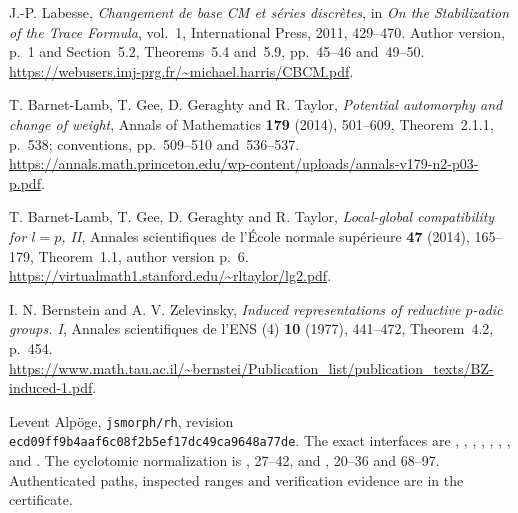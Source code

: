 J.-P. Labesse, \emph{Changement de base CM et s\'eries discr\`etes},
in \emph{On the Stabilization of the Trace Formula}, vol.~1,
International Press, 2011, 429--470.
Author version, p.~1 and Section~5.2, Theorems~5.4 and~5.9, pp.~45--46 and~49--50.
\url{https://webusers.imj-prg.fr/~michael.harris/CBCM.pdf}.

T. Barnet-Lamb, T. Gee, D. Geraghty and R. Taylor,
\emph{Potential automorphy and change of weight},
Annals of Mathematics \textbf{179} (2014), 501--609,
Theorem~2.1.1, p.~538; conventions, pp.~509--510 and~536--537.
\url{https://annals.math.princeton.edu/wp-content/uploads/annals-v179-n2-p03-p.pdf}.

T. Barnet-Lamb, T. Gee, D. Geraghty and R. Taylor,
\emph{Local-global compatibility for $l=p$, II},
Annales scientifiques de l'\'Ecole normale sup\'erieure
\textbf{47} (2014), 165--179,
Theorem~1.1, author version p.~6.
\url{https://virtualmath1.stanford.edu/~rltaylor/lg2.pdf}.

I. N. Bernstein and A. V. Zelevinsky,
\emph{Induced representations of reductive $p$-adic groups. I},
Annales scientifiques de l'ENS (4) \textbf{10} (1977), 441--472,
Theorem~4.2, p.~454.
\url{https://www.math.tau.ac.il/~bernstei/Publication_list/publication_texts/BZ-induced-1.pdf}.

Levent Alp\"oge, \texttt{jsmorph/rh},
revision \texttt{ecd09ff9b4aaf6c08f2b5ef17dc49ca9648a77de}.
The exact interfaces are ,
, ,
, ,
, , and .
The cyclotomic normalization is ,
27--42, and , 20--36 and 68--97.
Authenticated paths, inspected ranges and verification evidence are in the
 certificate.
